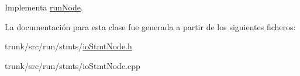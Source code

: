 Implementa \hyperlink{classrunNode_a83c10df8148829b08e04153c93d69eec}{run\-Node}.



La documentación para esta clase fue generada a partir de los siguientes ficheros\-:\begin{DoxyCompactItemize}
\item 
trunk/src/run/stmts/\hyperlink{ioStmtNode_8h}{io\-Stmt\-Node.\-h}\item 
trunk/src/run/stmts/io\-Stmt\-Node.\-cpp\end{DoxyCompactItemize}
